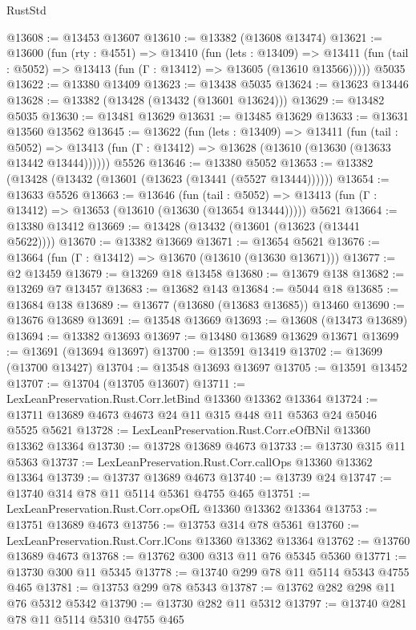 \begin{lexlean}{RustStd}
\begin{coremodule}
@13608 := @13453 @13607
@13610 := @13382 (@13608 @13474)
@13621 := @13600
    (fun (rty : @4551) =>
    @13410
      (fun (lets : @13409) =>
      @13411 (fun (tail : @5052) => @13413 (fun (Γ : @13412) => @13605 (@13610 @13566)))))
    @5035
@13622 := @13380 @13409
@13623 := @13438 @5035
@13624 := @13623 @13446
@13628 := @13382 (@13428 (@13432 (@13601 @13624)))
@13629 := @13482 @5035
@13630 := @13481 @13629
@13631 := @13485 @13629
@13633 := @13631 @13560 @13562
@13645 := @13622
    (fun (lets : @13409) =>
    @13411
      (fun (tail : @5052) =>
      @13413 (fun (Γ : @13412) => @13628 (@13610 (@13630 (@13633 @13442 @13444))))))
    @5526
@13646 := @13380 @5052
@13653 := @13382 (@13428 (@13432 (@13601 (@13623 (@13441 (@5527 @13444))))))
@13654 := @13633 @5526
@13663 := @13646
    (fun (tail : @5052) => @13413 (fun (Γ : @13412) => @13653 (@13610 (@13630 (@13654 @13444)))))
    @5621
@13664 := @13380 @13412
@13669 := @13428 (@13432 (@13601 (@13623 (@13441 @5622))))
@13670 := @13382 @13669
@13671 := @13654 @5621
@13676 := @13664 (fun (Γ : @13412) => @13670 (@13610 (@13630 @13671)))
@13677 := @2 @13459
@13679 := @13269 @18 @13458
@13680 := @13679 @138
@13682 := @13269 @7 @13457
@13683 := @13682 @143
@13684 := @5044 @18
@13685 := @13684 @138
@13689 := @13677 (@13680 (@13683 @13685)) @13460
@13690 := @13676 @13689
@13691 := @13548 @13669
@13693 := @13608 (@13473 @13689)
@13694 := @13382 @13693
@13697 := @13480 @13689 @13629 @13671
@13699 := @13691 (@13694 @13697)
@13700 := @13591 @13419
@13702 := @13699 (@13700 @13427)
@13704 := @13548 @13693 @13697
@13705 := @13591 @13452
@13707 := @13704 (@13705 @13607)
@13711 := LexLeanPreservation.Rust.Corr.letBind @13360 @13362 @13364
@13724 := @13711 @13689 @4673 @4673 @24 @11 @315 @448 @11 @5363 @24 @5046 @5525 @5621
@13728 := LexLeanPreservation.Rust.Corr.eOfBNil @13360 @13362 @13364
@13730 := @13728 @13689 @4673
@13733 := @13730 @315 @11 @5363
@13737 := LexLeanPreservation.Rust.Corr.callOps @13360 @13362 @13364
@13739 := @13737 @13689 @4673
@13740 := @13739 @24
@13747 := @13740 @314 @78 @11 @5114 @5361 @4755 @465
@13751 := LexLeanPreservation.Rust.Corr.opsOfL @13360 @13362 @13364
@13753 := @13751 @13689 @4673
@13756 := @13753 @314 @78 @5361
@13760 := LexLeanPreservation.Rust.Corr.lCons @13360 @13362 @13364
@13762 := @13760 @13689 @4673
@13768 := @13762 @300 @313 @11 @76 @5345 @5360
@13771 := @13730 @300 @11 @5345
@13778 := @13740 @299 @78 @11 @5114 @5343 @4755 @465
@13781 := @13753 @299 @78 @5343
@13787 := @13762 @282 @298 @11 @76 @5312 @5342
@13790 := @13730 @282 @11 @5312
@13797 := @13740 @281 @78 @11 @5114 @5310 @4755 @465

\end{coremodule}
\end{lexlean}
